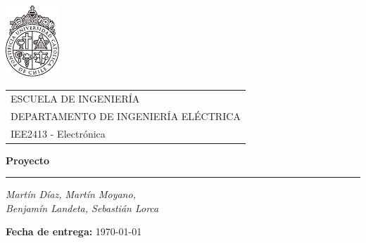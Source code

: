 \begin{titlepage}
    \includegraphics[width=2cm]{img/logo-uc-4.pdf} %
    \vspace*{-2.2cm} %


    \begin{tabular}{l}
        \hspace{2cm} ESCUELA DE INGENIERÍA                \\
        \hspace{2cm} DEPARTAMENTO DE INGENIERÍA ELÉCTRICA \\
        \hspace{2cm} IEE2413 - Electrónica                \\
    \end{tabular}

    \begin{center}
        \vspace{3cm}
        {\bfseries\Huge \textbf{Proyecto} \par}
        \rule{80mm}{0.1mm}

        {\itshape\LARGE Martín Díaz, Martín Moyano,\\ Benjamín Landeta, Sebasti\'an Lorca \par}
        \vfill

        \medskip
        \textbf{Fecha de entrega:} \today
        \vspace{3cm}
    \end{center}
\end{titlepage}
\newpage